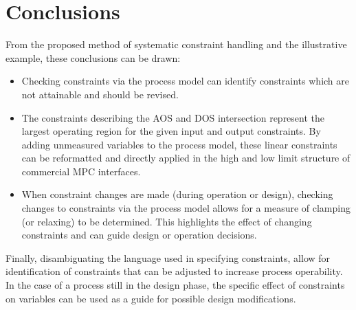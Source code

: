 \documentclass[final,authoryear,5pt,times,twocolumn]{elsarticle}
\begin{document}
\section{Conclusions}\label{sec:conclusions}
From the proposed method of systematic constraint handling and the illustrative example, these conclusions can be drawn:
\begin{itemize}
  \item Checking constraints via the process model can identify constraints which are not attainable and should be revised.
  \item The constraints describing the AOS and DOS intersection represent the largest operating region for the given input and output constraints.
By adding unmeasured variables to the process model, these linear constraints can be reformatted and directly applied in the high and low limit structure of commercial MPC interfaces.
  \item When constraint changes are made (during operation or design), checking changes to constraints via the process model allows for a measure of clamping (or relaxing) to be determined.
This highlights the effect of changing constraints and can guide design or operation decisions.
\end{itemize}

Finally, disambiguating the language used in specifying constraints, allow for identification of constraints that can be adjusted to increase process operability.
In the case of a process still in the design phase, the specific effect of constraints on variables can be used as a guide for possible design modifications. 



\end{document}
